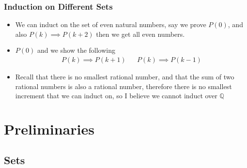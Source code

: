 \documentclass[11pt]{book}
\begin{document}
\subsection{Induction on Different Sets}%
\label{sub:induction_on_different_sets}

\begin{itemize}
    \item We can induct on the set of even natural numbers, say we prove $P\left(0\right) $,  and also $P\left(k\right) \implies P\left(k + 2\right) $ then we get all even numbers.
    \item $P\left(0\right) $ and we show the following 
        \begin{align*}
            P\left(k\right) \implies P\left(k + 1\right)  && P\left(k\right) \implies P\left(k - 1\right) 
        \end{align*}
    \item Recall that there is no smallest rational number, and that the sum of two rational numbers is also a rational number, therefore there is no smallest increment that we can induct on, so I believe we cannot induct over $\mathbb{Q} $ 
\end{itemize}



\chapter{Preliminaries}%
\label{chp:preliminaries}

\section{Sets}%
\label{sec:sets}
\end{document}
